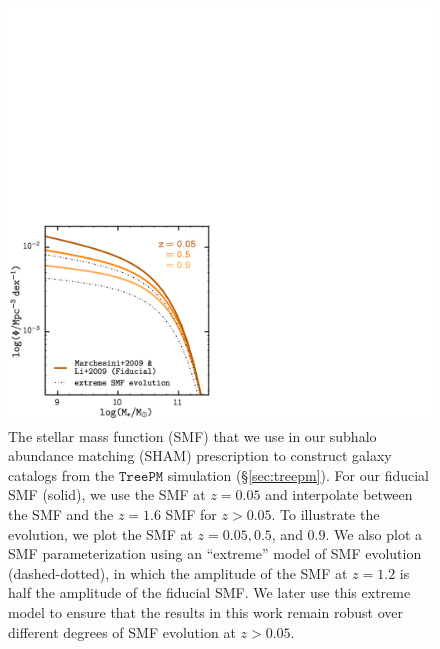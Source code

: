 \documentclass[iop,apj,tighten,twocolappendix,numberedappendix]{emulateapj}
\begin{document}
\begin{figure}
\begin{center}
\includegraphics[scale=0.45]{figs/SMF_evol.pdf}
\caption{The stellar mass function (SMF) that we use in 
our subhalo abundance matching (SHAM) prescription to construct 
galaxy catalogs from the \cite{Wetzel:2013aa} $\mathtt{TreePM}$ 
simulation (\S \ref{sec:treepm}). For our fiducial 
SMF (solid), we use the \cite{Li:2009aa} SMF at $z = 0.05$ and 
interpolate between the \cite{Li:2009aa} SMF and the 
\cite{Marchesini:2009aa} $z = 1.6$ SMF for $z > 0.05$. To illustrate 
the evolution, we plot the SMF at $z=0.05, 0.5$, and $0.9$.
We also plot a SMF parameterization using an ``extreme''
model of SMF evolution (dashed-dotted), in which the amplitude
of the SMF at $z = 1.2$ is half the amplitude of the fiducial SMF. 
We later use this extreme model to ensure that the results in this 
work remain robust over different degrees of SMF evolution at 
$z > 0.05$.}
\label{fig:smf_evol}
\end{center}
\end{figure}
\end{document}
